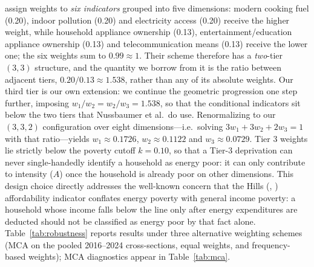 \documentclass[11pt, a4paper]{article}
\begin{document}
\textcite[Table 2, p. 235]{nussbaumer2012} assign weights to \emph{six indicators} grouped into five dimensions: modern cooking fuel (0.20), indoor pollution (0.20) and electricity access (0.20) receive the higher weight, while household appliance ownership (0.13), entertainment/education appliance ownership (0.13) and telecommunication means (0.13) receive the lower one; the six weights sum to $0.99 \approx 1$. Their scheme therefore has a \emph{two}-tier $(3,3)$ structure, and the quantity we borrow from it is the ratio between adjacent tiers, $0.20/0.13 \approx 1.538$, rather than any of its absolute weights. Our third tier is our own extension: we continue the geometric progression one step further, imposing $w_1/w_2 = w_2/w_3 = 1.538$, so that the conditional indicators sit below the two tiers that Nussbaumer et al.\ do use. Renormalizing to our $(3, 3, 2)$ configuration over eight dimensions---i.e.\ solving $3 w_1 + 3 w_2 + 2 w_3 = 1$ with that ratio---yields $w_1 \approx 0.1726$, $w_2 \approx 0.1122$ and $w_3 \approx 0.0729$. Tier 3 weights lie strictly below the poverty cutoff $k=0.10$, so that a Tier-3 deprivation can never single-handedly identify a household as energy poor: it can only contribute to intensity ($A$) once the household is already poor on other dimensions. This design choice directly addresses the well-known concern that the Hills (\citeyear{hills2011}, \citeyear{hills2012}) affordability indicator conflates energy poverty with general income poverty: a household whose income falls below the line only after energy expenditures are deducted should not be classified as energy poor by that fact alone. Table~\ref{tab:robustness} reports results under three alternative weighting schemes (MCA on the pooled 2016--2024 cross-sections, equal weights, and frequency-based weights); MCA diagnostics appear in Table~\ref{tab:mca}.
\end{document}
